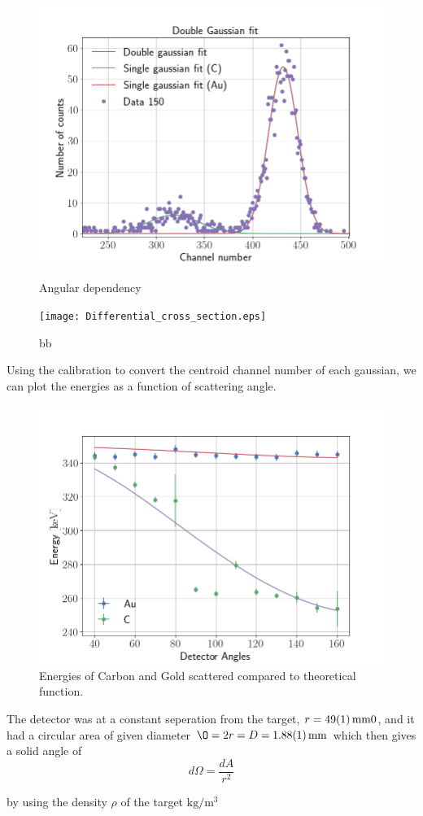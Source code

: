 \begin{figure}
\includegraphics[width=0.99\columnwidth]{Data_150}
\label{fig_angular_dependency2}
\caption{Angular dependency}
\end{figure}


\begin{figure}[h]
	\centering
		\texttt{[image: Differential\_cross\_section.eps]}
	\caption{bb}
	\label{fig:Differential_cross_section}
\end{figure}

Using the calibration to convert the centroid channel number of each gaussian,
we can plot the energies as a function of scattering angle.

\begin{figure}[h!]
\centering
\includegraphics[width=0.99\columnwidth]{fig_energy}
\caption{Energies of Carbon and Gold scattered compared to theoretical
function.}
\label{fig_energy}
\end{figure}


The detector was at a constant seperation from the target, $r =
\SI{49\pm1}{\milli\meter}0$, and it had a circular
area of given diameter $Ø=2r=D=\SI{1.88 \pm 0.01}{\milli\meter}$ which then
gives a solid angle of
\begin{equation}
d\Omega = \frac{dA}{r^2}
\end{equation}

by using the density $\rho$ of the target $\si{\kg\per\cubic\meter}$ 


\newpage
